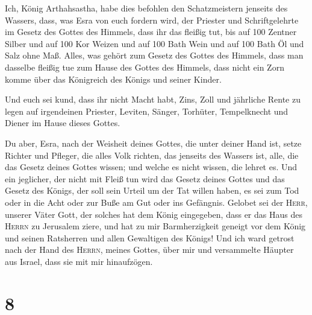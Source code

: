  Ich, König Arthahsastha, habe dies befohlen den
Schatzmeistern jenseits des Wassers, dass, was Esra von euch fordern
wird, der Priester und Schriftgelehrte im Gesetz des Gottes des Himmels,
dass ihr das fleißig tut,  bis auf 100 Zentner Silber und
auf 100 Kor Weizen und auf 100 Bath Wein und auf 100 Bath Öl und Salz
ohne Maß.  Alles, was gehört zum Gesetz des Gottes des
Himmels, dass man dasselbe fleißig tue zum Hause des Gottes des Himmels,
dass nicht ein Zorn komme über das Königreich des Königs und seiner
Kinder.

 Und euch sei kund, dass ihr nicht Macht habt, Zins, Zoll
und jährliche Rente zu legen auf irgendeinen Priester, Leviten, Sänger,
Torhüter, Tempelknecht und Diener im Hause dieses Gottes.

 Du aber, Esra, nach der Weisheit deines Gottes, die
unter deiner Hand ist, setze Richter und Pfleger, die alles Volk
richten, das jenseits des Wassers ist, alle, die das Gesetz deines
Gottes wissen; und welche es nicht wissen, die lehret es.
 Und ein jeglicher, der nicht mit Fleiß tun wird das
Gesetz deines Gottes und das Gesetz des Königs, der soll sein Urteil um
der Tat willen haben, es sei zum Tod oder in die Acht oder zur Buße am
Gut oder ins Gefängnis.  Gelobet sei der \textsc{Herr},
unserer Väter Gott, der solches hat dem König eingegeben, dass er das
Haus des \textsc{Herrn} zu Jerusalem ziere,  und hat zu
mir Barmherzigkeit geneigt vor dem König und seinen Ratsherren und allen
Gewaltigen des Königs! Und ich ward getrost nach der Hand des
\textsc{Herrn}, meines Gottes, über mir und versammelte Häupter aus
Israel, dass sie mit mir hinaufzögen.

\hypertarget{section-7}{%
\section{8}\label{section-7}}

